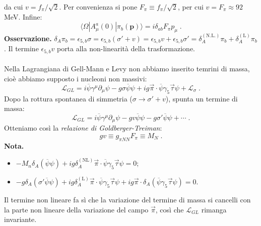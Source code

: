 \documentclass[12pt,a4paper]{article}
\theoremstyle{definition}
\newcommand{\lag}{\mathcal{L}}
\newcommand{\bra}{\langle}
\newcommand{\ket}{\rangle}
\numberwithin{equation}{section}
\begin{document}
da cui $v=f_{\pi}/\sqrt{2}$. Per convenienza si pone $F_{\pi}\equiv f_{\pi}/\sqrt{2}$, per cui $v=F_{\pi}\approx 92$ MeV. Infine:
\begin{equation}
\bra\Omega|A^a_{\mu}(0)|\pi_b(\mathbf{p})\ket=i\delta_{ab}F_{\pi}p_{\mu}\;.
\end{equation}
\textbf{Osservazione.} $\delta_A\pi_b=\epsilon_{5,b}\sigma=\epsilon_{5,b}(\sigma'+v)=\epsilon_{5,b}v+\epsilon_{5,b}\sigma'=\delta_A^{(\mathrm{N.L.})}\pi_b+\delta_A^{(\mathrm{L})}\pi_b$. Il termine $\epsilon_{5,b}v$ porta alla non-linearità della trasformazione. \\
\\
Nella Lagrangiana di Gell-Mann e Levy non abbiamo inserito temrini di massa, cioè abbiamo supposto i nucleoni non massivi:
$$
\lag_{GL}=i\overline{\psi}\gamma^{\mu}\partial_{\mu}\psi-g\sigma\overline{\psi}\psi+ig\vec{\pi}\cdot\overline{\psi}\gamma_5\vec{\tau}\psi+\lag_{\sigma}\;.
$$
Dopo la rottura spontanea di simmetria ($\sigma\to\sigma'+v$), spunta un termine di massa:
$$
\lag_{GL}=i\overline{\psi}\gamma^{\mu}\partial_{\mu}\psi-gv\overline{\psi}\psi-g\sigma'\overline{\psi}\psi+\cdots\;.
$$
Otteniamo così la \emph{relazione di Goldberger-Treiman}:
\begin{equation}
gv\equiv g_{\pi NN}F_{\pi}\equiv M_N\;.
\end{equation}
\textbf{Nota.}
\begin{itemize}
\item $-M_n\delta_A(\overline{\psi}\psi)+ig\delta_A^{(\mathrm{NL})}\vec{\pi}\cdot \overline{\psi}\gamma_5\vec{\tau}\psi=0$;
\item $-g\delta_A(\sigma'\overline{\psi}\psi)+ig\delta_A^{(\mathrm{L})}\vec{\pi}\cdot\overline{\psi}\gamma_5\vec{\tau}\psi+ig\vec{\pi}\cdot\delta_A(\overline{\psi}\gamma_5\vec{\tau}\psi)=0$.
\end{itemize}
Il termine non lineare fa sì che la variazione del termine di massa si cancelli con la parte non lineare della variazione del campo $\vec{\pi}$, così che $\lag_{GL}$ rimanga invariante.
\end{document}
